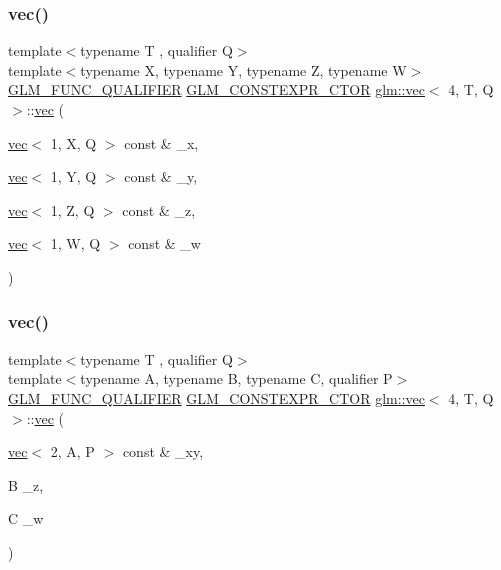 \subsubsection{\texorpdfstring{vec()}{vec()}\hspace{0.1cm}{\footnotesize\ttfamily [22/34]}}
{\footnotesize\ttfamily template$<$typename T , qualifier Q$>$ \\
template$<$typename X, typename Y, typename Z, typename W$>$ \\
\hyperlink{setup_8hpp_a33fdea6f91c5f834105f7415e2a64407}{G\+L\+M\+\_\+\+F\+U\+N\+C\+\_\+\+Q\+U\+A\+L\+I\+F\+I\+ER} \hyperlink{setup_8hpp_ad34178a09666081abdb573c14d1f4a5a}{G\+L\+M\+\_\+\+C\+O\+N\+S\+T\+E\+X\+P\+R\+\_\+\+C\+T\+OR} \hyperlink{structglm_1_1vec}{glm\+::vec}$<$ 4, T, Q $>$\+::\hyperlink{structglm_1_1vec}{vec} (\begin{DoxyParamCaption}\item[{\hyperlink{structglm_1_1vec}{vec}$<$ 1, X, Q $>$ const \&}]{\+\_\+x,  }\item[{\hyperlink{structglm_1_1vec}{vec}$<$ 1, Y, Q $>$ const \&}]{\+\_\+y,  }\item[{\hyperlink{structglm_1_1vec}{vec}$<$ 1, Z, Q $>$ const \&}]{\+\_\+z,  }\item[{\hyperlink{structglm_1_1vec}{vec}$<$ 1, W, Q $>$ const \&}]{\+\_\+w }\end{DoxyParamCaption})}

\mbox{\label{structglm_1_1vec_3_014_00_01_t_00_01_q_01_4_a1624a51ea4a5641d8d6a49dc499fcae9}} 
\subsubsection{\texorpdfstring{vec()}{vec()}\hspace{0.1cm}{\footnotesize\ttfamily [23/34]}}
{\footnotesize\ttfamily template$<$typename T , qualifier Q$>$ \\
template$<$typename A, typename B, typename C, qualifier P$>$ \\
\hyperlink{setup_8hpp_a33fdea6f91c5f834105f7415e2a64407}{G\+L\+M\+\_\+\+F\+U\+N\+C\+\_\+\+Q\+U\+A\+L\+I\+F\+I\+ER} \hyperlink{setup_8hpp_ad34178a09666081abdb573c14d1f4a5a}{G\+L\+M\+\_\+\+C\+O\+N\+S\+T\+E\+X\+P\+R\+\_\+\+C\+T\+OR} \hyperlink{structglm_1_1vec}{glm\+::vec}$<$ 4, T, Q $>$\+::\hyperlink{structglm_1_1vec}{vec} (\begin{DoxyParamCaption}\item[{\hyperlink{structglm_1_1vec}{vec}$<$ 2, A, P $>$ const \&}]{\+\_\+xy,  }\item[{B}]{\+\_\+z,  }\item[{C}]{\+\_\+w }\end{DoxyParamCaption})}

